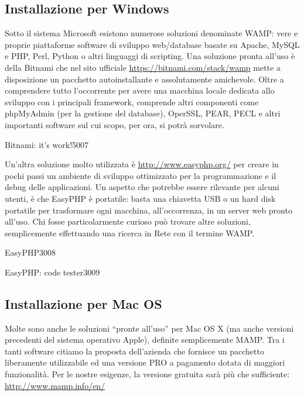 \label{sec:installazione}
\subsection{Installazione per Windows}
Sotto il sistema Microsoft esistono numerose soluzioni denominate \ac{WAMP}: vere e proprie piattaforme software di sviluppo web/database basate su Apache, MySQL e PHP, Perl, Python o altri linguaggi di scripting. Una soluzione pronta all'uso è  della Bitnami che nel sito ufficiale \url{https://bitnami.com/stack/wamp} mette a disposizione un pacchetto autoinstallante e assolutamente amichevole. Oltre a comprendere tutto l'occorrente per avere una macchina locale dedicata allo sviluppo con i principali framework, comprende altri componenti come phpMyAdmin (per la gestione del database), OperSSL, PEAR, PECL e altri importanti software sul cui scopo, per ora, si potrà sorvolare. 

\begin{img}{Bitnami: it's work!}{5}{007}
\end{img}

Un'altra soluzione molto utilizzata è  \url{http://www.easyphp.org/} per creare in pochi passi un ambiente di sviluppo ottimizzato per la programmazione e il debug delle applicazioni. Un aspetto che potrebbe essere rilevante per alcuni utenti, è che EasyPHP è portatile: basta una chiavetta USB o un hard disk portatile per trasformare ogni macchina, all'occorrenza, in un server web pronto all'uso. Chi fosse particolarmente curioso può trovare altre soluzioni, semplicemente effettuando una ricerca in Rete con il termine \ac{WAMP}.

\begin{img}{EasyPHP}{3}{008}
\end{img}

\begin{img}{EasyPHP: code tester}{3}{009}
\end{img}

\subsection{Installazione per Mac OS}
Molte sono anche le soluzioni ``pronte all'uso'' per Mac OS X (ma anche versioni precedenti del sistema operativo Apple), definite semplicemente \ac{MAMP}. Tra i tanti software citiamo la proposta dell'azienda  che fornisce un pacchetto liberamente utilizzabile ed una versione PRO a pagamento dotata di maggiori funzionalità. Per le nostre esigenze, la versione gratuita sarà più che sufficiente: \url{http://www.mamp.info/en/}

